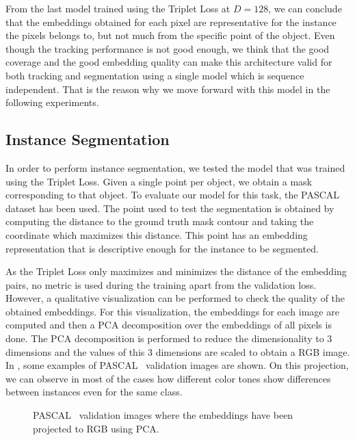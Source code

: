 From the last model trained using the Triplet Loss at $D=128$, we can conclude that the embeddings obtained for each pixel are representative for the instance the pixels belongs to, but not much from the specific point of the object.
Even though the tracking performance is not good enough, we think that the good coverage and the good embedding quality can make this architecture valid for both tracking and segmentation using a single model which is sequence independent.
That is the reason why we move forward with this model in the following experiments.



\subsection{Instance Segmentation}

In order to perform instance segmentation, we tested the model that was trained using the Triplet Loss.
Given a single point per object, we obtain a mask corresponding to that object.
To evaluate our model for this task, the PASCAL~\pascal{} dataset has been used.
The point used to test the segmentation is obtained by computing the distance to the ground truth mask contour and taking the coordinate which maximizes this distance.
This point has an embedding representation that is descriptive enough for the instance to be segmented.

As the Triplet Loss only maximizes and minimizes the distance of the embedding pairs, no metric is used during the training apart from the validation loss.
However, a qualitative visualization can be performed to check the quality of the obtained embeddings.
For this visualization, the embeddings for each image are computed  and then a PCA decomposition over the embeddings of all pixels is done.
The PCA decomposition is performed to reduce the dimensionality to 3 dimensions and the values of this 3 dimensions are scaled to obtain a RGB image.
In , some examples of PASCAL~\pascal{} validation images are shown.
On this projection, we can observe in most of the cases how different color tones show differences between instances even for the same class.

\begin{figure}[h]
  \centering
  \caption{PASCAL~\pascal{} validation images where the embeddings have been projected to RGB using PCA.}
  \label{fig:experiments:segmentation:pca}
\end{figure}


